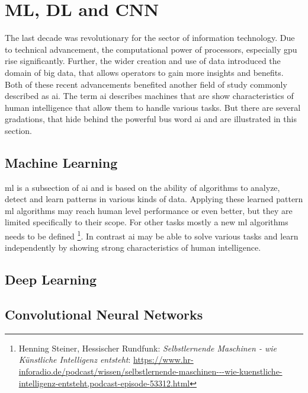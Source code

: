 
\section{ML, DL and CNN}\label{ord:ch2:sec1}

The last decade was revolutionary for the sector of information technology.
Due to technical advancement, the computational power of processors, especially \gls{gpu} rise significantly.
Further, the wider creation and use of data introduced the domain of big data, that allows operators to gain more insights and benefits.
Both of these recent advancements benefited another field of study commonly described as \gls{ai}.
The term \gls{ai} describes machines that are show characteristics of human intelligence that allow them to handle various tasks.
But there are several gradations, that hide behind the powerful bus word \gls{ai} and are illustrated in this section.

\subsection{Machine Learning}\label{ord:ch2:sec1:subsec1}

\gls{ml} is a subsection of \gls{ai} and is based on the ability of algorithms to analyze, detect and learn patterns in various kinds of data. 
Applying these learned pattern \gls{ml} algorithms may reach human level performance or even better, but they are limited specifically to their scope.
For other tasks mostly a new \gls{ml} algorithms needs to be defined 
\footnote{Henning Steiner, Hessischer Rundfunk: \textit{Selbstlernende Maschinen - wie Künstliche Intelligenz entsteht}: \url{https://www.hr-inforadio.de/podcast/wissen/selbstlernende-maschinen---wie-kuenstliche-intelligenz-entsteht,podcast-episode-53312.html}}.
In contrast \gls{ai} may be able to solve various tasks and learn independently by showing strong characteristics of human intelligence.



\subsection{Deep Learning}\label{ord:ch2:sec1:subsec2}
\subsection{Convolutional Neural Networks}\label{ord:ch2:sec1:subsec3}

